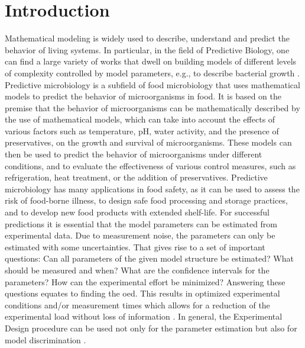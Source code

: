 \documentclass[10pt,A4paper]{article}
\begin{document}
\section*{Introduction}
%
Mathematical modeling is widely used to describe, understand and predict the behavior of living systems.
In particular, in the field of Predictive Biology, one can find a large variety of works that dwell on building models of different levels of complexity controlled by model parameters, e.g., to describe bacterial growth \cite{bernaertsConceptsToolsPredictive2004}.
Predictive microbiology is a subfield of food microbiology that uses mathematical models to predict the behavior of microorganisms in food.
It is based on the premise that the behavior of microorganisms can be mathematically described by the use of mathematical models, which can take into account the effects of various factors such as temperature, pH, water activity, and the presence of preservatives, on the growth and survival of microorganisms.
These models can then be used to predict the behavior of microorganisms under different conditions, and to evaluate the effectiveness of various control measures, such as refrigeration, heat treatment, or the addition of preservatives.
Predictive microbiology has many applications in food safety, as it can be used to assess the risk of food-borne illness, to design safe food processing and storage practices, and to develop new food products with extended shelf-life.
For successful predictions it is essential that the model parameters can be estimated from experimental data.
Due to measurement noise, the parameters can only be estimated with some uncertainties.
That gives rise to a set of important questions: Can all parameters of the given model structure be estimated?
What should be measured and when? What are the confidence intervals for the parameters? How can the experimental effort be minimized?
Answering these questions equates to finding the \ac{oed}.
This results in optimized experimental conditions and/or measurement times which allows for a reduction of the experimental load without loss of information \cite{derlindenImpactExperimentDesign2013, balsa-cantoe.bangaj.r.COMPUTINGOPTIMALDYNAMIC2008}.
In general, the Experimental Design procedure can be used not only for the parameter estimation but also for model discrimination \cite{kreutzSystemsBiology2009, stamatiOptimalExperimentalDesign2016}.
\end{document}
